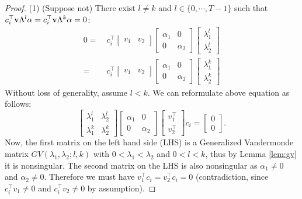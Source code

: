 \documentclass[journal]{IEEEtran}
\begin{document}
\begin{proof}
(1) (Suppose not) There exist $l \neq k$ and $l \in \{ 0, \cdots, T-1 \}$ such that $c_i^\top {\bf v} \Lambda^l \alpha = c_i^\top {\bf v} \Lambda^k \alpha= 0$:
\begin{equation}
\begin{aligned}
0 = ~& c_i^\top \begin{bmatrix} v_1 & v_2 \end{bmatrix} \begin{bmatrix} \alpha_1 & 0 \\ 0 & \alpha_2 \end{bmatrix} \begin{bmatrix} \lambda_1^l \\ \lambda_2^l \end{bmatrix} \\
= ~ & c_i^\top \begin{bmatrix} v_1 & v_2 \end{bmatrix} \begin{bmatrix} \alpha_1 & 0 \\ 0 & \alpha_2 \end{bmatrix} \begin{bmatrix} \lambda_1^k \\ \lambda_2^k \end{bmatrix} \nonumber
\end{aligned}
\end{equation}
Without loss of generality, assume $l<k$. We can reformulate above equation as follows:
\begin{equation}
	\begin{bmatrix} \lambda_1^{l} & \lambda_2^l \\ \lambda_1^k & \lambda_2^k \end{bmatrix} \begin{bmatrix} \alpha_1 & 0 \\ 0 & \alpha_2 \end{bmatrix} 
	\begin{bmatrix} v_1^\top \\ v_2^\top \end{bmatrix} c_i = \begin{bmatrix} 0 \\ 0 \end{bmatrix}. \nonumber 
\end{equation}
Now, the first matrix on the left hand side (LHS) is a Generalized Vandermonde matrix $GV(\lambda_1,\lambda_2;l, k)$ with $0<\lambda_1< \lambda_2$ and $0< l<k$, thus by Lemma \ref{lem:gv} it is nonsingular. The second matrix on the LHS is also nonsingular as $\alpha_1 \neq 0$ and $\alpha_2 \neq 0$. Therefore we must have $v_1^\top c_i = v_2^\top c_i = 0$ (contradiction, since $c_i^\top v_1 \neq 0$ and $c_i^\top v_2 \neq 0$ by assumption).


\end{proof}
\end{document}
